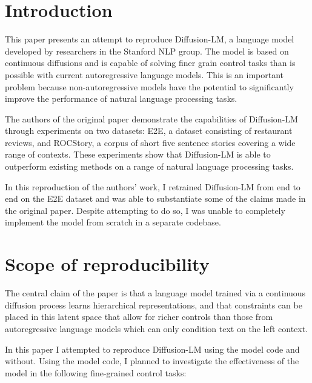 \section{Introduction}

This paper presents an attempt to reproduce Diffusion-LM, a language model developed by researchers in the Stanford NLP group. The model is based on continuous diffusions and is capable of solving finer grain control tasks than is possible with current autoregressive language models. This is an important problem because non-autoregressive models have the potential to significantly improve the performance of natural language processing tasks.

The authors of the original paper demonstrate the capabilities of Diffusion-LM through experiments on two datasets: E2E, a dataset consisting of restaurant reviews, and ROCStory, a corpus of short five sentence stories covering a wide range of contexts. These experiments show that Diffusion-LM is able to outperform existing methods on a range of natural language processing tasks.

In this reproduction of the authors' work, I retrained Diffusion-LM from end to end on the E2E dataset and was able to substantiate some of the claims made in the original paper. Despite attempting to do so, I was unable to completely implement the model from scratch in a separate codebase.

\section{Scope of reproducibility}
\label{sec:claims}

The central claim of the paper is that a language model trained via a continuous diffusion process learns hierarchical representations, and that constraints can be placed in this latent space that allow for richer controls than those from autoregressive language models which can only condition text on the left context.

In this paper I attempted to reproduce Diffusion-LM using the model code and without. Using the model code, I planned to investigate the effectiveness of the model in the following fine-grained control tasks:

